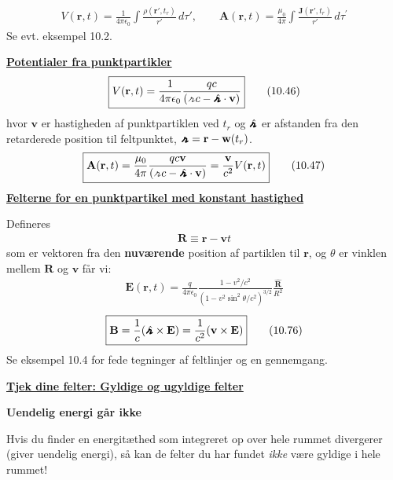 \documentclass[a4paper]{article}
\begin{document}
    \begin{align*}
        \boxed{V(\mathbf{r}, t) = \frac{1}{4 \pi \epsilon_0} \int \frac{\rho(\mathbf{r}', t_r)}{r'} \, d\tau',\qquad
        \mathbf{A}(\mathbf{r}, t) = \frac{\mu_0}{4 \pi} \int \frac{\mathbf{J}(\mathbf{r}', t_r)}{r'} \, d\tau^{\prime} } \tag{10.26}
    \end{align*}
    Se evt. eksempel 10.2.

    \underline{\textbf{Potentialer fra punktpartikler}}
    \begin{align*}
        \boxed{V(\mathbf{r}, t) = \frac{1}{4\pi\epsilon_0} \frac{qc}{(\griffr[2] c - \hatgriffr \cdot \mathbf{v})}} \tag{10.46}
    \end{align*} 
    hvor \(\mathbf{v}\) er hastigheden af punktpartiklen ved \(t_r\) og \(\hatgriffr \) er afstanden fra den retarderede position til feltpunktet, \(\griffr[4] = \mathbf{r} - \mathbf{w}(t_r)\).
    \begin{align*}
        \boxed{\mathbf{A}(\mathbf{r}, t) = \frac{\mu _0}{4 \pi } \frac{qc \mathbf{v}}{(\griffr[2] c - \hatgriffr \cdot \mathbf{v})} = \frac{\mathbf{v}}{c^{2} } V(\mathbf{r}, t)} \tag{10.47}
    \end{align*}
    \underline{\textbf{Felterne for en punktpartikel med konstant hastighed}}
    
    Defineres 
    \begin{align*}
        \mathbf{R} \equiv  \mathbf{r} - \mathbf{v}t
    \end{align*} 
    som er vektoren fra den \textbf{nuværende} position af partiklen til \(\mathbf{r}\), og \(\theta \) er vinklen mellem \(\mathbf{R}\) og \(\mathbf{v}\) får vi: \begin{align*}
        \boxed{\mathbf{E}(\mathbf{r}, t) = \frac{q}{4 \pi \epsilon_0} 
        \frac{1 - v^2 / c^2}{\left( 1 - v^2 \sin^2 \theta / c^2 \right)^{3/2}} 
        \frac{\hat{\mathbf{R}}}{R^2}} \tag{10.75}
    \end{align*}     
    \begin{align*}
        \boxed{\mathbf{B} = \frac{1}{c} (\hatgriffr \times \mathbf{E}) = \frac{1}{c^{2} } (\mathbf{v} \times \mathbf{E})}\tag{10.76}
    \end{align*}
    Se eksempel 10.4 for fede tegninger af feltlinjer og en gennemgang.

    \underline{\textbf{Tjek dine felter: Gyldige og ugyldige felter}}

    \textbf{Uendelig energi går ikke}

    Hvis du finder en energitæthed som integreret op over hele rummet divergerer (giver uendelig energi), så kan de felter du har fundet \textit{ikke} være gyldige i hele rummet!
    
\end{document}
